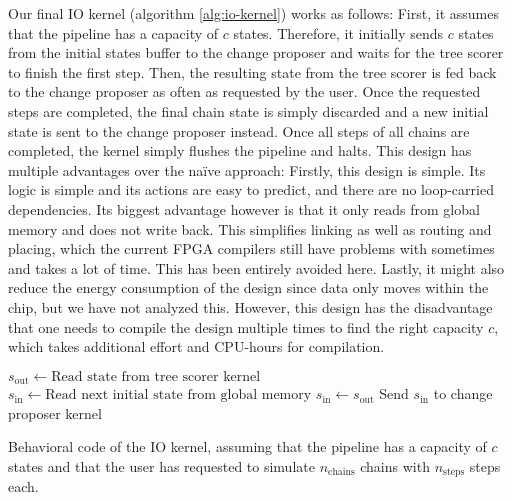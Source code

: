 Our final IO kernel (algorithm \ref{alg:io-kernel}) works as follows: First, it assumes that the pipeline has a capacity of $c$ states. Therefore, it initially sends $c$ states from the initial states buffer to the change proposer and waits for the tree scorer to finish the first step. Then, the resulting state from the tree scorer is fed back to the change proposer as often as requested by the user. Once the requested steps are completed, the final chain state is simply discarded and a new initial state is sent to the change proposer instead. Once all steps of all chains are completed, the kernel simply flushes the pipeline and halts. This design has multiple advantages over the na\"ive approach: Firstly, this design is simple. Its logic is simple and its actions are easy to predict, and there are no loop-carried dependencies. Its biggest advantage however is that it only reads from global memory and does not write back. This simplifies linking as well as routing and placing, which the current \ac{FPGA} compilers still have problems with sometimes and takes a lot of time. This has been entirely avoided here. Lastly, it might also reduce the energy consumption of the design since data only moves within the chip, but we have not analyzed this. However, this design has the disadvantage that one needs to compile the design multiple times to find the right capacity $c$, which takes additional effort and \ac{CPU}-hours for compilation.

\begin{algorithm}
    \begin{algorithmic}
                \State $s_\mathrm{out} \leftarrow \text{Read state from tree scorer kernel}$
            \EndIf
                    \State $s_\mathrm{in} \leftarrow \text{Read next initial state from global memory}$
                \Else
                    \State $s_\mathrm{in} \leftarrow s_\mathrm{out}$
                \EndIf
                \State Send $s_\mathrm{in}$ to change proposer kernel
            \EndIf
        \EndFor
    \end{algorithmic}
    \caption{Behavioral code of the IO kernel, assuming that the pipeline has a capacity of $c$ states and that the user has requested to simulate $n_\mathrm{chains}$ chains with $n_\mathrm{steps}$ steps each.}
    \label{alg:io-kernel}
\end{algorithm}